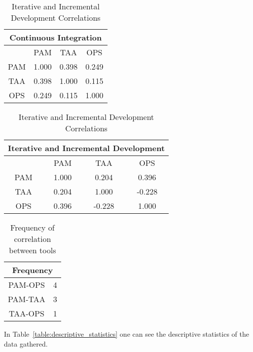\begin{table} [H]
 \RawFloats %
 \begin{minipage}{.45\textwidth}
  \caption{Continuous Integration Correlations}
  \label{table:ci_correlations}
  \begin{tabular}{| c | c | c | c | } \hline
  \multicolumn{4}{|c|}{\textbf{Continuous Integration}}  \\ \hline
   & \ac{PAM} & \ac{TAA} & \ac{OPS} \\ \hline
  \ac{PAM} & 1.000 & 0.398 & 0.249 \\ \hline
  \ac{TAA} & 0.398 & 1.000 & 0.115 \\ \hline
  \ac{OPS} & 0.249 & 0.115 & 1.000 \\ \hline
 \end{tabular}
 \end{minipage}%
%
 \begin{minipage}{.45\textwidth}
  \centering
   \caption{Iterative and Incremental Development Correlations}
  \label{table:iid_correlations}
  \begin{tabular}{| c | c | c | c |} \hline
  \multicolumn{4}{|c|}{\textbf{Iterative and Incremental Development}}  \\ \hline
  & \ac{PAM} & \ac{TAA} & \ac{OPS} \\ \hline
  \ac{PAM} & 1.000 & 0.204 & 0.396 \\ \hline
  \ac{TAA} & 0.204 & 1.000 & -0.228 \\ \hline
  \ac{OPS} & 0.396 & -0.228 & 1.000 \\ \hline
 \end{tabular}
 \end{minipage}%
\end{table}

\begin{table} [H]
	\caption{Frequency of correlation between tools}
	\label{table:correlations_frequency}
	\begin{tabular}{| c | c |} \hline
		\multicolumn{2}{|c|}{\textbf{Frequency}}  \\ \hline
		\ac{PAM}-\ac{OPS} & 4 \\ \hline
		\ac{PAM}-\ac{TAA} & 3 \\ \hline
		\ac{TAA}-\ac{OPS} & 1 \\ \hline
	\end{tabular}
\end{table}


In Table~\ref{table:descriptive_statistics} one can see the descriptive statistics of the data gathered.

